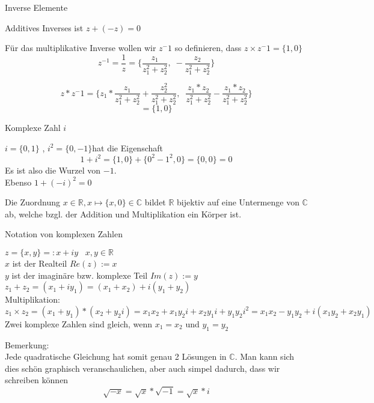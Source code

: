 \documentclass[headsepline,12pt,a4paper]{scrartcl}
\begin{document}
\begin{center}
\item[Inverse Elemente]
\end{center}
\item Additives Inverses ist $ z + (-z) = 0$ \\
\item Für das multiplikative Inverse wollen wir $z^-1 $ so definieren, dass $z \times z^-1 = \{1,0\} $ \\

$$ z^{-1} = \frac{1}{z} = \{\frac{z_1}{z^2_1 + z^2_2} , \;  - \frac{z_2}{z^2_1 + z^2_2}\} $$

$$ z * z^-1 = \{z_1 * \frac{z_1}{z^2_1+z^2_2} + \frac{z^2_2}{z^2_1+z^2_2}, \; \; \frac{z_1*z_2}{z^2_1+z^2_2} - \frac{z_1*z_2}{z^2_1+z^2_2}\} 
$$ 
$$ = \{1,0\} $$

\begin{center}
\item[Komplexe Zahl $i$]
\end{center}
\item $ i = \{0,1\} $ , $ i^2 = \{0,-1\} $hat die Eigenschaft \\
$$ 1+i^2 = \{1,0\} + \{0^2-1^2,0 \} = \{0,0\} = 0 $$ Es ist also die Wurzel von $-1$. \\
Ebenso $ 1+(-i)^2 = 0 $\\
\item Die Zuordnung  $x \in \mathbb{R}, x \mapsto \{x,0\} \in \mathbb{C} $ bildet $\mathbb{R}$ bijektiv auf eine Untermenge von $\mathbb{C}$ ab, welche bzgl. der Addition und Multiplikation ein Körper ist.

\newpage

\begin{center}
\item[Notation von komplexen Zahlen]
\end{center}
\item $z=\{x,y\} =: x+iy  \; \; \; x,y \in \mathbb{R} $ \\
$x$ ist der Realteil $Re(z):= x$ \\
$y$ ist der imaginäre bzw. komplexe Teil $Im(z):= y$ \\
$z_1+z_2 = (x_1+iy_1) = (x_1+x_2) + i(y_1+y_2) $ \\
Multiplikation:
$$ z_1\times z_2 = (x_1+y_1)*(x_2+y_2i) = x_1 x_2+x_1 y_2i+x_2 y_1i + y_1y_2 i^2 = x_1x_2 - y_1y_2 + i(x_1y_2+x_2y_1) $$
Zwei komplexe Zahlen sind gleich, wenn $x_1=x_2 $ und $y_1 = y_2 $ 

\item Bemerkung:\\
Jede quadratische Gleichung hat somit genau 2 Lösungen in $\mathbb{C}$. Man kann sich dies schön graphisch veranschaulichen, aber auch simpel dadurch, dass wir schreiben können $$ \sqrt{-x} = \sqrt{x} * \sqrt{-1} = \sqrt{x} * i $$
\end{document}

